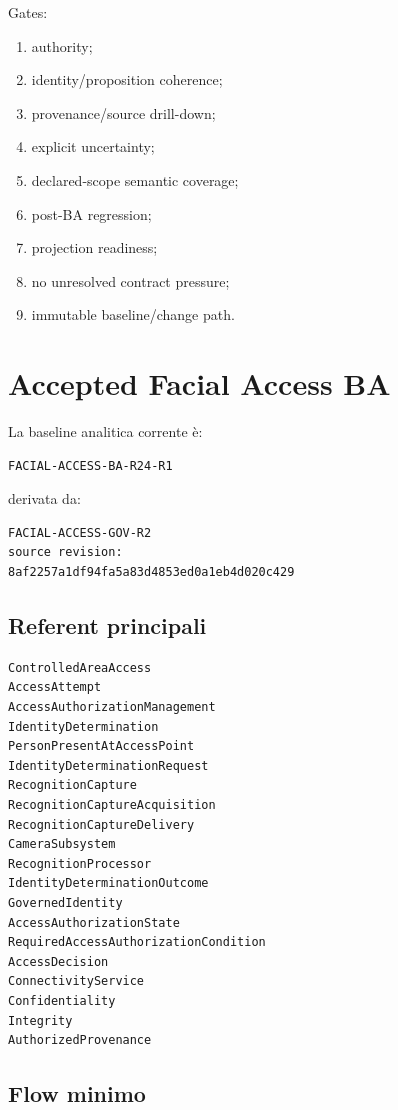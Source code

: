 \documentclass[11pt,a4paper]{article}
\begin{document}
Gates:

\begin{enumerate}
\item authority;
\item identity/proposition coherence;
\item provenance/source drill-down;
\item explicit uncertainty;
\item declared-scope semantic coverage;
\item post-BA regression;
\item projection readiness;
\item no unresolved contract pressure;
\item immutable baseline/change path.
\end{enumerate}

\section{Accepted Facial Access BA}

La baseline analitica corrente è:

\begin{lstlisting}
FACIAL-ACCESS-BA-R24-R1
\end{lstlisting}

derivata da:

\begin{lstlisting}
FACIAL-ACCESS-GOV-R2
source revision:
8af2257a1df94fa5a83d4853ed0a1eb4d020c429
\end{lstlisting}

\subsection{Referent principali}

\begin{lstlisting}
ControlledAreaAccess
AccessAttempt
AccessAuthorizationManagement
IdentityDetermination
PersonPresentAtAccessPoint
IdentityDeterminationRequest
RecognitionCapture
RecognitionCaptureAcquisition
RecognitionCaptureDelivery
CameraSubsystem
RecognitionProcessor
IdentityDeterminationOutcome
GovernedIdentity
AccessAuthorizationState
RequiredAccessAuthorizationCondition
AccessDecision
ConnectivityService
Confidentiality
Integrity
AuthorizedProvenance
\end{lstlisting}

\subsection{Flow minimo}
\end{document}
